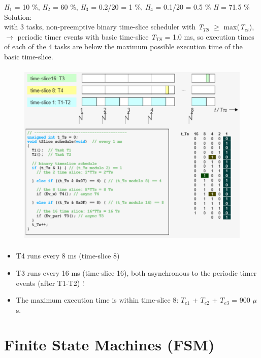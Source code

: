 \begin{enumerate}
\textit{ H}${}_{1}$ = 10 \%, \textit{H}${}_{2}$ = 60 \%, \textit{H}${}_{3}$ = 0.2/20 = 1 \%, \textit{H}${}_{4}$ = 0.1/20 = 0.5 \%  \textit{H} = 71.5 \%\\

Solution:\\
with 3 tasks, non-preemptive binary time-slice scheduler with \textit{T${}_{TS}$} $\mathrm{\ge}$ max(\textit{T${}_{ei}$}), \\

$\rightarrow$ periodic timer events with basic time-slice \textit{T${}_{TS}$} = 1.0 ms, so execution times of each of the 4 tasks are below the maximum possible execution time of the basic time-slice.

	\begin{figure}[h]
    \centering
    \includegraphics[width=14cm, height=9cm]{Images/image157.png}
    \label{fig:Fig 108}
    \end{figure}
   
\begin{itemize}
\item T4 runs every 8 ms (time-slice 8)
\item T3 runs every 16 ms (time-slice 16), both asynchronous to the periodic timer events  (after T1-T2) !
\item The maximum execution time is within time-slice 8: $T_{e1}$ + $T_{e2}$ + $T_{e3}$ = 900 $\mu$s.
\end{itemize}
\end{enumerate} 
\newpage 

\section{Finite State Machines (FSM)}

